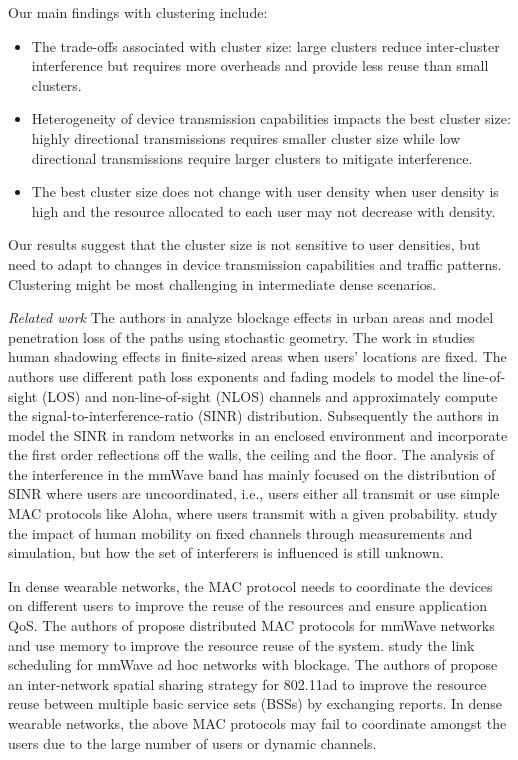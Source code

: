 \documentclass[10pt, conference, letterpaper]{IEEEtran}
\begin{document}
Our main findings with clustering include:
\begin{itemize}
	\item The trade-offs associated with cluster size: large clusters reduce inter-cluster interference but requires more overheads and provide less reuse than small clusters.
	\item Heterogeneity of device transmission capabilities impacts the best cluster size: highly directional transmissions requires smaller cluster size while low directional transmissions require larger clusters to mitigate interference. 
	\item The best cluster size does not change with user density when user density is high and the resource allocated to each user may not decrease with density. 
\end{itemize}

Our results suggest that the cluster size is not sensitive to user densities, but need to adapt to changes in device transmission capabilities and traffic patterns. Clustering might be most challenging in intermediate dense scenarios.

\emph{Related work}
The authors in \cite{urbanblockage} analyze blockage effects in urban areas and model penetration loss of the paths using stochastic geometry. 
The work in \cite{interferencefinitesized} studies human shadowing effects in finite-sized areas when users' locations are fixed. 
The authors use different path loss exponents and fading models to model the line-of-sight (LOS) and non-line-of-sight (NLOS) channels and approximately compute the signal-to-interference-ratio (SINR) distribution. 
Subsequently the authors in \cite{enclosedmmwave} model the SINR in random networks in an enclosed environment and incorporate the first order reflections off the walls, the ceiling and the floor. 
The analysis of the interference in the mmWave band has mainly focused on the distribution of SINR where users are uncoordinated, i.e., users  either all transmit or use simple MAC protocols like Aloha, where users transmit with a given probability. 
\cite{humanactivity}\cite{timevaryingpathshadowing}\cite{blockagein60ghz}study the impact of human mobility on fixed channels through measurements and simulation, but how the set of interferers is influenced is still unknown.

In dense wearable networks, the MAC protocol needs to coordinate the devices on different users to improve the reuse of the resources and ensure application QoS. 
The authors of \cite{dtdmac}\cite{mdmac} propose distributed MAC protocols for mmWave networks and use memory to improve the resource reuse of the system. 
\cite{onlinkscheduling} study the link scheduling for mmWave ad hoc networks with blockage.
The authors of \cite{intersharing} propose an inter-network spatial sharing strategy for 802.11ad to improve the resource reuse between multiple basic service sets (BSSs) by exchanging reports.
In dense wearable networks, the above MAC protocols may fail to coordinate amongst the users due to the large number of users or dynamic channels. 
\end{document}
